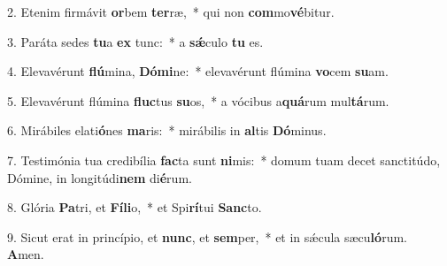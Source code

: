 2. Etenim firmávit \textbf{or}bem \textbf{ter}ræ,~*  qui non \textbf{com}mo\textbf{vé}bitur.\

3. Paráta sedes \textbf{tu}a \textbf{ex} tunc:~*  a \textbf{sǽ}culo \textbf{tu} es.\

4. Elevavérunt \textbf{flú}mina, \textbf{Dó}\textbf{mi}ne:~*  elevavérunt flúmina \textbf{vo}cem \textbf{su}am.\

5. Elevavérunt flúmina \textbf{fluc}tus \textbf{su}os,~*  a vócibus a\textbf{quá}rum mul\textbf{tá}rum.\

6. Mirábiles elati\textbf{ó}nes \textbf{ma}ris:~*  mirábilis in \textbf{al}tis \textbf{Dó}minus.\

7. Testimónia tua credibília \textbf{fac}ta sunt \textbf{ni}mis:~*  domum tuam decet sanctitúdo, Dómine, in longitúdi\textbf{nem} di\textbf{é}rum.\

8. Glória \textbf{Pa}tri, et \textbf{Fí}\textbf{li}o,~*  et Spi\textbf{rí}tui \textbf{Sanc}to.\

9. Sicut erat in princípio, et \textbf{nunc}, et \textbf{sem}per,~*  et in sǽcula sæcu\textbf{ló}rum. \textbf{A}men.\

